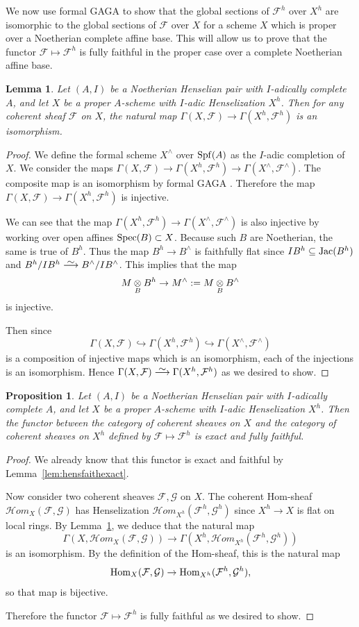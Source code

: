 \documentclass[12pt]{article}
\newcommand\simto{\stackrel{\textstyle\sim}{\smash{\longrightarrow}\rule{0pt}{0.4ex}}}
\newcommand{\F}{\mathcal{F}}
\newcommand{\G}{\mathcal{G}}
\newcommand{\spec}{{\rm Spec}}
\newcommand{\spf}{{\rm Spf}}
\newcommand{\Hom}{{\rm Hom}}
\newcommand{\mc}[1]{\mathcal{#1}}
\newtheorem{proposition}[theorem]{Proposition}
\newtheorem{lemma}[theorem]{Lemma}
\theoremstyle{definition}
\numberwithin{equation}{subsection}
\begin{document}
We now use formal GAGA to show that the global sections of $\F^h$ over $X^h$ are isomorphic to the global sections of $\F$ over $X$ for a scheme $X$ which is proper over a Noetherian complete affine base. This will allow us to prove that the functor $\F \mapsto \F^h$ is fully faithful in the proper case over a complete Noetherian affine base.
 
 \begin{lemma}\label{lem:h0gen} Let $(A,I)$ be a Noetherian Henselian pair with $I$-adically complete $A$, and let $X$ be a proper $A$-scheme with $I$-adic Henselization $X^h$. Then for any coherent sheaf $\F$ on $X$, the natural map $\Gamma(X,\F) \to \Gamma(X^h,\F^h)$ is an isomorphism. \end{lemma}
\begin{proof} 

We define the formal scheme $X^\wedge$ over $\spf(A)$ as the $I$-adic completion of $X$. We consider the maps $\Gamma(X,\F) \to \Gamma(X^h,\F^h) \to \Gamma(X^\wedge,\F^\wedge)$. The composite map is an isomorphism by formal GAGA \cite[Theorem 5.1.4]{ega31}. Therefore the map $\Gamma(X,\F) \to \Gamma(X^h,\F^h)$ is injective.

We can see that the map $\Gamma(X^h,\F^h) \to \Gamma(X^\wedge,\F^\wedge)$ is also injective by working over open affines $\spec(B) \subset X$. Because such $B$ are Noetherian, the same is true of $B^h$. Thus the map  $B^h \to B^\wedge$ is faithfully flat since $IB^h \subseteq {\rm Jac}(B^h)$ and $B^h/IB^h \simto B^\wedge/IB^\wedge$. This implies that the map $$M \tens_B B^h \to M^\wedge := M \tens_B B^\wedge$$ is injective. 

Then since $$\Gamma(X,\F)  \hookrightarrow \Gamma(X^h,\F^h) \hookrightarrow \Gamma(X^\wedge,\F^\wedge)$$ is a composition of injective maps which is an isomorphism, each of the injections is an isomorphism. Hence $\Gamma(X,\F) \simto \Gamma(X^h,\F^h)$ as we desired to show.\end{proof}

\begin{proposition}\label{prop:hensffulexact}  Let $(A,I)$ be a Noetherian Henselian pair with $I$-adically complete $A$, and let $X$ be a proper $A$-scheme with $I$-adic Henselization $X^h$. Then the functor between the category of coherent sheaves on $X$ and the category of coherent sheaves on $X^h$ defined by $\F \mapsto \F^h$ is exact and fully faithful.
\end{proposition}
\begin{proof} We already know that this functor is exact and faithful by Lemma~\ref{lem:hensfaithexact}. 

Now consider two coherent sheaves $\F,\G$ on $X$. The coherent Hom-sheaf $\mc{H}om_X(\F,\G)$ has Henselization $\mc{H}om_{X^h}(\F^h,\G^h)$ since $X^h \to X$ is flat on local rings. By Lemma~\ref{lem:h0gen}, we deduce that the natural map $$\Gamma(X,\mc{H}om_X(\F,\G)) \to \Gamma(X^h,\mc{H}om_{X^h}(\F^h,\G^h))$$ is an isomorphism. By the definition of the Hom-sheaf, this is the natural map $$\Hom_X(\F,\G) \to \Hom_{X^h}(\F^h,\G^h),$$ so that map is bijective.

Therefore the functor $\F \mapsto \F^h$ is fully faithful as we desired to show.\end{proof}
\end{document}
